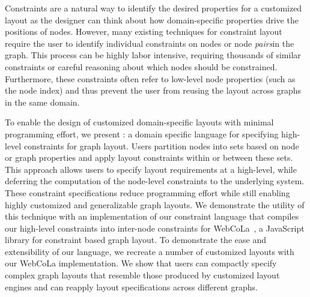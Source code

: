 Constraints are a natural way to identify the desired properties for a
customized layout as the designer can think about how domain-specific
properties drive the positions of nodes. However, many existing techniques
for constraint layout require the user to identify individual constraints
on nodes or node \emph{pairs}in the graph. This process can be highly labor
intensive, requiring thousands of similar constraints or careful reasoning
about which nodes should be constrained. Furthermore, these constraints often
refer to low-level node properties (such as the node index) and thus prevent
the user from reusing the layout across graphs in the same domain.

To enable the design of customized domain-specific layouts with minimal
programming effort, we present \projectname: a domain specific language for
specifying high-level constraints for graph layout. Users partition nodes
into sets based on node or graph properties and apply layout constraints
within or between these sets. This approach allows users to specify layout
requirements at a high-level, while deferring the computation of the
node-level constraints to the underlying system. These constraint
specifications reduce programming effort while still enabling highly
customized and generalizable graph layouts. We demonstrate the utility of
this technique with an implementation of our constraint language that
compiles our high-level constraints into inter-node constraints for
WebCoLa~\cite{WebCoLa}, a JavaScript library for constraint based graph
layout. To demonstrate the ease and extensibility of our language, we
recreate a number of customized layouts with our WebCoLa implementation. We
show that users can compactly specify complex graph layouts that resemble
those produced by customized layout engines and can reapply layout
specifications across different graphs.
